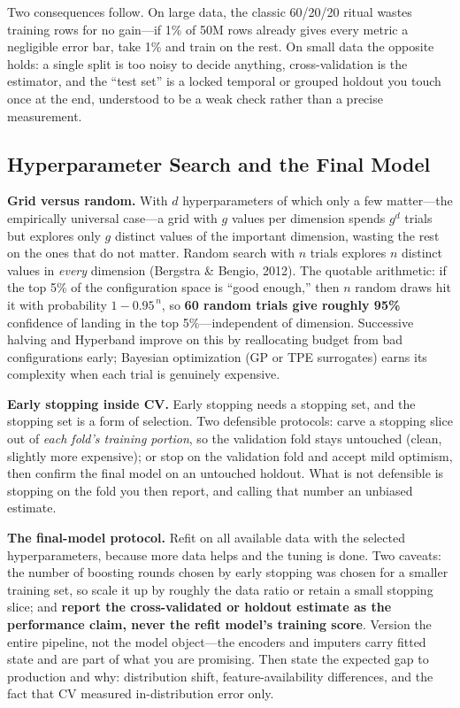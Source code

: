 Two consequences follow. On large data, the classic 60/20/20 ritual wastes training rows for no gain---if 1\% of 50M rows already gives every metric a negligible error bar, take 1\% and train on the rest. On small data the opposite holds: a single split is too noisy to decide anything, cross-validation is the estimator, and the ``test set'' is a locked temporal or grouped holdout you touch once at the end, understood to be a weak check rather than a precise measurement.

\subsection{Hyperparameter Search and the Final Model}

\textbf{Grid versus random.} With $d$ hyperparameters of which only a few matter---the empirically universal case---a grid with $g$ values per dimension spends $g^d$ trials but explores only $g$ distinct values of the important dimension, wasting the rest on the ones that do not matter. Random search with $n$ trials explores $n$ distinct values in \emph{every} dimension (Bergstra \& Bengio, 2012). The quotable arithmetic: if the top 5\% of the configuration space is ``good enough,'' then $n$ random draws hit it with probability $1 - 0.95^{\,n}$, so \textbf{60 random trials give roughly 95\%} confidence of landing in the top 5\%---independent of dimension. Successive halving and Hyperband improve on this by reallocating budget from bad configurations early; Bayesian optimization (GP or TPE surrogates) earns its complexity when each trial is genuinely expensive.

\textbf{Early stopping inside CV.} Early stopping needs a stopping set, and the stopping set is a form of selection. Two defensible protocols: carve a stopping slice out of \emph{each fold's training portion}, so the validation fold stays untouched (clean, slightly more expensive); or stop on the validation fold and accept mild optimism, then confirm the final model on an untouched holdout. What is not defensible is stopping on the fold you then report, and calling that number an unbiased estimate.

\textbf{The final-model protocol.} Refit on all available data with the selected hyperparameters, because more data helps and the tuning is done. Two caveats: the number of boosting rounds chosen by early stopping was chosen for a smaller training set, so scale it up by roughly the data ratio or retain a small stopping slice; and \textbf{report the cross-validated or holdout estimate as the performance claim, never the refit model's training score}. Version the entire pipeline, not the model object---the encoders and imputers carry fitted state and are part of what you are promising. Then state the expected gap to production and why: distribution shift, feature-availability differences, and the fact that CV measured in-distribution error only.

